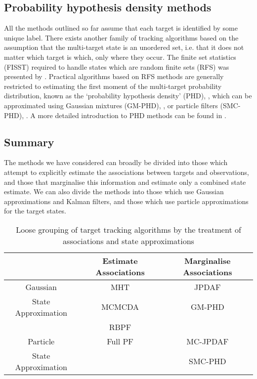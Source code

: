 \subsection{Probability hypothesis density methods}
All the methods outlined so far assume that each target is identified by some unique label. There exists another family of tracking algorithms based on the assumption that the multi-target state is an unordered set, i.e. that it does not matter which target is which, only where they occur. The finite set statistics (FISST) required to handle states which are random finite sets (RFS) was presented by \cite{Mahler1994}. Practical algorithms based on RFS methods are generally restricted to estimating the first moment of the multi-target probability distribution, known as the `probability hypothesis density' (PHD), \cite{Mahler2003}, which can be approximated using Gaussian mixtures (GM-PHD), \cite{Vo2006}, or particle filters (SMC-PHD), \cite{Vo2005,Whiteley2010}. A more detailed introduction to PHD methods can be found in \cite{Mahler2004,Wood2010}.



\subsection{Summary}
The methods we have considered can broadly be divided into those which attempt to explicitly estimate the associations between targets and observations, and those that marginalise this information and estimate only a combined state estimate. We can also divide the methods into those which use Gaussian approximations and Kalman filters, and those which use particle approximations for the target states.

\begin{table}[!hbt]%
\begin{center}\begin{tabular}{|c|c|c|}
\hline
 & Estimate Associations & Marginalise Associations\\
\hline
Gaussian & MHT & JPDAF \\
State Approximation & MCMCDA & GM-PHD \\ 
 & RBPF & \\
\hline
Particle & Full PF & MC-JPDAF \\
State Approximation & & SMC-PHD \\
\hline
\end{tabular}\end{center}
\caption{Loose grouping of target tracking algorithms by the treatment of associations and state approximations}
\label{}
\end{table}
